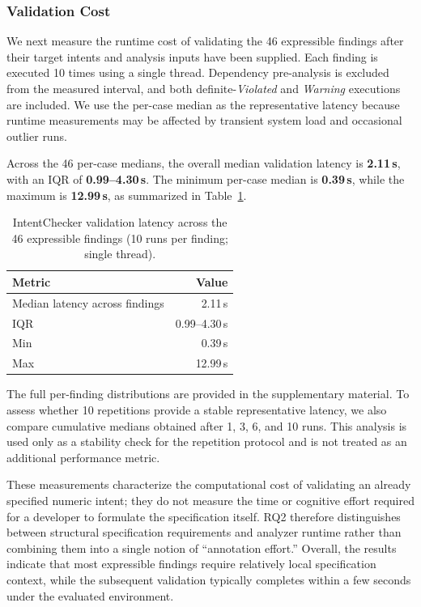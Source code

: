 \documentclass[pdflatex,sn-basic]{sn-jnl}%
\theoremstyle{thmstyleone}%
\theoremstyle{thmstyletwo}%
\theoremstyle{thmstylethree}%
\begin{document}
\subsubsection{Validation Cost}\label{sec:rq2:cost}

We next measure the runtime cost of validating the 46 expressible findings after
their target intents and analysis inputs have been supplied. Each finding is
executed 10 times using a single thread. Dependency pre-analysis is excluded from
the measured interval, and both definite-\textit{Violated} and
\textit{Warning} executions are included. We use the per-case median as the
representative latency because runtime measurements may be affected by transient
system load and occasional outlier runs.

Across the 46 per-case medians, the overall median validation latency is
\textbf{2.11\,s}, with an IQR of \textbf{0.99--4.30\,s}.
The minimum per-case median is \textbf{0.39\,s}, while the maximum is
\textbf{12.99\,s}, as summarized in Table~\ref{tab:rq2-latency}.

\begin{table}[t]
\centering
\caption{IntentChecker validation latency across the 46 expressible findings
(10 runs per finding; single thread).}
\label{tab:rq2-latency}
\small
\begin{tabular}{lr}
\toprule
\textbf{Metric} & \textbf{Value} \\
\midrule
Median latency across findings & 2.11\,s \\
IQR                            & 0.99--4.30\,s \\
Min                            & 0.39\,s \\
Max                            & 12.99\,s \\
\bottomrule
\end{tabular}
\end{table}

The full per-finding distributions are provided in the supplementary material.
To assess whether 10 repetitions provide a stable representative latency, we also
compare cumulative medians obtained after 1, 3, 6, and 10 runs. This analysis is
used only as a stability check for the repetition protocol and is not treated as
an additional performance metric.

These measurements characterize the computational cost of validating an already
specified numeric intent; they do not measure the time or cognitive effort required
for a developer to formulate the specification itself. RQ2 therefore distinguishes
between structural specification requirements and analyzer runtime rather than
combining them into a single notion of ``annotation effort.'' Overall, the results
indicate that most expressible findings require relatively local specification
context, while the subsequent validation typically completes within a few seconds
under the evaluated environment.
\end{document}
